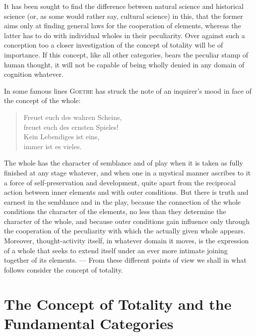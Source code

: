 \documentclass[12pt]{book}
\newcommand{\opage}[1]{\marginnote{\footnotesize\textit{[#1]}}}
\begin{document}
It has been sought to find the difference between natural science and historical
science (or, as some would rather say, cultural science) in this, that the
former aims only at finding general laws for the cooperation of elements,
whereas the latter has to do with individual wholes in their peculiarity. Over
against such a conception too a closer investigation of the concept of totality
will be of importance. If this concept, like all other categories, bears the
peculiar stamp of human thought, it will not be capable of being wholly denied
in any domain of cognition whatever.

In some famous lines \textsc{Goethe} has struck the note of an inquirer's mood
in face of the concept of the whole:

\begin{verse}
Freuet euch des wahren Scheins,\\
freuet euch des ernsten Spieles!\\
Kein Lebendiges ist eins,\\
immer ist es vieles.
\end{verse}

The whole has the character of semblance and of play when it is taken as fully
finished at any stage whatever, and when one in a mystical manner ascribes to it
a force of self-preservation and development, quite apart from the reciprocal
action between inner elements and with outer conditions. But there is truth and
earnest in the semblance and in \opage{23}the play, because the connection of the whole
conditions the character of the elements, no less than they determine the
character of the whole, and because outer conditions gain influence only through
the cooperation of the peculiarity with which the actually given whole appears.
Moreover, thought-activity itself, in whatever domain it moves, is the
expression of a whole that seeks to extend itself under an ever more intimate
joining together of its elements. --- From these different points of view we
shall in what follows consider the concept of totality.



\chapter{The Concept of Totality and the Fundamental Categories}
\label{ch:2}
\end{document}
